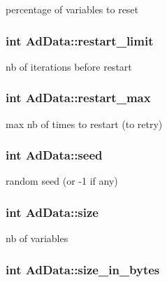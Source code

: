 percentage of variables to reset \hypertarget{classAdData_a58c6bec33a86d9151b9830f604244211}{
\subsubsection[{restart\-\_\-limit}]{\setlength{\rightskip}{0pt plus 5cm}int {\bf \-Ad\-Data\-::restart\-\_\-limit}}}\label{classAdData_a58c6bec33a86d9151b9830f604244211}
nb of iterations before restart \hypertarget{classAdData_a1dbcbad666cf9f7fa881706082cb70a7}{
\subsubsection[{restart\-\_\-max}]{\setlength{\rightskip}{0pt plus 5cm}int {\bf \-Ad\-Data\-::restart\-\_\-max}}}\label{classAdData_a1dbcbad666cf9f7fa881706082cb70a7}
max nb of times to restart (to retry) \hypertarget{classAdData_ad9a435db71511ecf195e7903f16db966}{
\subsubsection[{seed}]{\setlength{\rightskip}{0pt plus 5cm}int {\bf \-Ad\-Data\-::seed}}}\label{classAdData_ad9a435db71511ecf195e7903f16db966}
random seed (or -\/1 if any) \hypertarget{classAdData_a510cbe13195442be22c03caee16d19a9}{
\subsubsection[{size}]{\setlength{\rightskip}{0pt plus 5cm}int {\bf \-Ad\-Data\-::size}}}\label{classAdData_a510cbe13195442be22c03caee16d19a9}
nb of variables \hypertarget{classAdData_a604888715fe344ae4a3331de9283a021}{
\subsubsection[{size\-\_\-in\-\_\-bytes}]{\setlength{\rightskip}{0pt plus 5cm}int {\bf \-Ad\-Data\-::size\-\_\-in\-\_\-bytes}}}\label{classAdData_a604888715fe344ae4a3331de9283a021}
